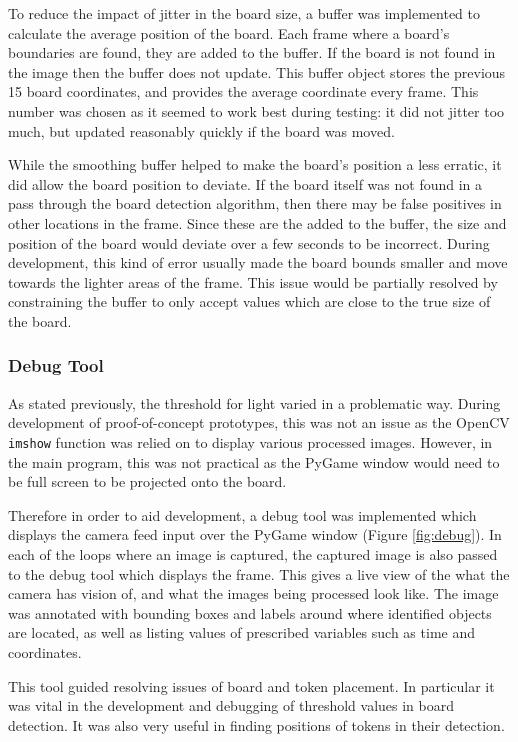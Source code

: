 \documentclass[12pt]{article}
\begin{document}
To reduce the impact of jitter in the board size, a buffer was implemented to calculate the average position of the board. 
Each frame where a board's boundaries are found, they are added to the buffer. 
If the board is not found in the image then the buffer does not update. 
This buffer object stores the previous 15 board coordinates, and provides the average coordinate every frame. 
This number was chosen as it seemed to work best during testing: it did not jitter too much, but updated reasonably quickly if the board was moved. 

While the smoothing buffer helped to make the board's position a less erratic, it did allow the board position to deviate. 
If the board itself was not found in a pass through the board detection algorithm, then there may be false positives in other locations in the frame. 
Since these are the added to the buffer, the size and position of the board would deviate over a few seconds to be incorrect.
During development, this kind of error usually made the board bounds smaller and move towards the lighter areas of the frame. 
This issue would be partially resolved by constraining the buffer to only accept values which are close to the true size of the board. 

\subsubsection{Debug Tool}
As stated previously, the threshold for light varied in a problematic way. 
During development of proof-of-concept prototypes, this was not an issue as the OpenCV \texttt{imshow} function was relied on to display various processed images. 
However, in the main program, this was not practical as the PyGame window would need to be full screen to be projected onto the board. 

Therefore in order to aid development, a debug tool was implemented which displays the camera feed input over the PyGame window (Figure \ref{fig:debug}). 
In each of the loops where an image is captured, the captured image is also passed to the debug tool which displays the frame.
This gives a live view of the what the camera has vision of, and what the images being processed look like.
The image was annotated with bounding boxes and labels around where identified objects are located, as well as listing values of prescribed variables such as time and coordinates. 

This tool guided resolving issues of board and token placement. 
In particular it was vital in the development and debugging of threshold values in board detection. 
It was also very useful in finding positions of tokens in their detection.
\end{document}

